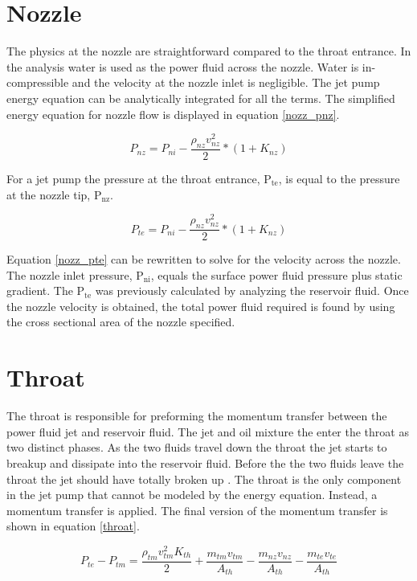 \documentclass[12 pt]{report}
\newcommand{\pte}{$\mathrm{P_{te}}$\xspace}  %
\newcommand{\pnz}{$\mathrm{P_{nz}}$\xspace}  %
\newcommand{\pni}{$\mathrm{P_{ni}}$\xspace}  %
\begin{document}
\section{Nozzle}

The physics at the nozzle are straightforward compared to the throat entrance. In the analysis water is used as the power fluid across the nozzle. Water is in-compressible and the velocity at the nozzle inlet is negligible. The jet pump energy equation can be analytically integrated for all the terms. The simplified energy equation for nozzle flow is displayed in equation \eqref{nozz_pnz}.

\begin{equation}
P_{nz} = P_{ni} - \frac{\rho_{nz}v_{nz}^2}{2}*(1+K_{nz})
\label{nozz_pnz}
\end{equation}

For a jet pump the pressure at the throat entrance, \pte, is equal to the pressure at the nozzle tip, \pnz.

\begin{equation}
P_{te} = P_{ni} - \frac{\rho_{nz}v_{nz}^2}{2}*(1+K_{nz})
\label{nozz_pte}
\end{equation}

Equation \eqref{nozz_pte} can be rewritten to solve for the velocity across the nozzle. The nozzle inlet pressure, \pni, equals the surface power fluid pressure plus static gradient. The \pte was previously calculated by analyzing the reservoir fluid. Once the nozzle velocity is obtained, the total power fluid required is found by using the cross sectional area of the nozzle specified.

\section{Throat}

The throat is responsible for preforming the momentum transfer between the power fluid jet and reservoir fluid. The jet and oil mixture the enter the throat as two distinct phases. As the two fluids travel down the throat the jet starts to breakup and dissipate into the reservoir fluid. Before the the two fluids leave the throat the jet should have totally broken up \cite{cunn_break}. The throat is the only component in the jet pump that cannot be modeled by the energy equation. Instead, a momentum transfer is applied. The final version of the momentum transfer is shown in equation \eqref{throat}.

\begin{equation}
P_{te} - P_{tm} = \frac{\rho_{tm}v_{tm}^{2}K_{th}}{2} 
 + \frac{m_{tm}v_{tm}}{A_{th}} - \frac{m_{nz}v_{nz}}{A_{th}} - \frac{m_{te}v_{te}}{A_{th}}
\label{throat}
\end{equation}
\end{document}
